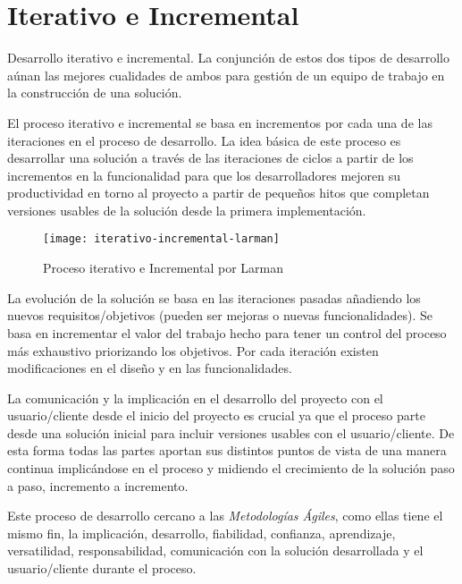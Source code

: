 \section{Iterativo e Incremental}
\label{sec:iterativo-incremental}

\par Desarrollo iterativo e incremental. La conjunción de estos dos tipos de desarrollo aúnan las mejores cualidades de ambos para gestión de un equipo de trabajo en la construcción de una solución.

\par El proceso iterativo e incremental se basa en incrementos por cada una de las iteraciones en el proceso de desarrollo. La idea básica de este proceso es desarrollar una solución a través de las iteraciones de ciclos a partir de los incrementos en la funcionalidad para que los desarrolladores mejoren su productividad en torno al proyecto a partir de pequeños hitos que completan versiones usables de la solución desde la primera implementación.

\begin{figure}[H]
    \centering
    \texttt{[image: iterativo-incremental-larman]}
    \caption{Proceso iterativo e Incremental por Larman}
    \label{fig:iterativo-incremental-larman}
\end{figure}

\par La evolución de la solución se basa en las iteraciones pasadas añadiendo los nuevos requisitos/objetivos (pueden ser mejoras o nuevas funcionalidades). Se basa en incrementar el valor del trabajo hecho para tener un control del proceso más exhaustivo priorizando los objetivos. Por cada iteración existen modificaciones en el diseño y en las funcionalidades.

\par La comunicación y la implicación en el desarrollo del proyecto con el usuario/cliente desde el inicio del proyecto es crucial ya que el proceso parte desde una solución inicial para incluir versiones usables con el usuario/cliente. De esta forma todas las partes aportan sus distintos puntos de vista de una manera continua implicándose en el proceso y midiendo el crecimiento de la solución paso a paso, incremento a incremento.

\par Este proceso de desarrollo cercano a las \emph{Metodologías Ágiles}, como ellas tiene el mismo fin, la implicación, desarrollo, fiabilidad, confianza, aprendizaje, versatilidad, responsabilidad, comunicación con la solución desarrollada y el usuario/cliente durante el proceso.

